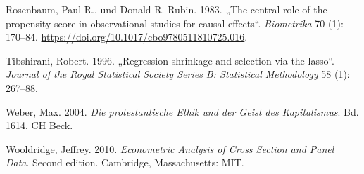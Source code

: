 \documentclass[
  a4paper,
  DIV=11,
  oneside]{scrreprt}
\newlength{\cslhangindent}
\newenvironment{CSLReferences}[2] %
 {\begin{list}{}{%
  \setlength{\itemindent}{0pt}
  \setlength{\leftmargin}{0pt}
  \setlength{\parsep}{0pt}
  \ifodd #1
   \setlength{\leftmargin}{\cslhangindent}
   \setlength{\itemindent}{-1\cslhangindent}
  \fi
  \setlength{\itemsep}{#2\baselineskip}}}
 {\end{list}}
\begin{document}
\begin{CSLReferences}{1}{0}
Rosenbaum, Paul R., und Donald R. Rubin. 1983. {„The central role of the
propensity score in observational studies for causal effects``}.
\emph{Biometrika} 70 (1): 170--84.
\url{https://doi.org/10.1017/cbo9780511810725.016}.

Tibshirani, Robert. 1996. {„Regression shrinkage and selection via the
lasso``}. \emph{Journal of the Royal Statistical Society Series B:
Statistical Methodology} 58 (1): 267--88.

Weber, Max. 2004. \emph{Die protestantische Ethik und der Geist des
Kapitalismus}. Bd. 1614. CH Beck.

Wooldridge, Jeffrey. 2010. \emph{Econometric Analysis of Cross Section
and Panel Data}. Second edition. Cambridge, Massachusetts: MIT.

\end{CSLReferences}
\end{document}
